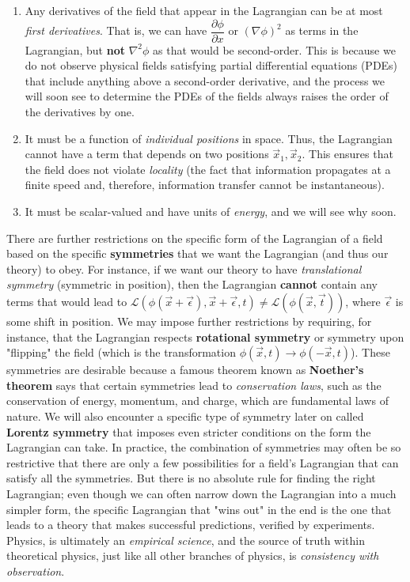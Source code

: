 \begin{enumerate}
    \item Any derivatives of the field that appear in the Lagrangian can be at most \emph{first derivatives}. That is, we can have $\dfrac{\partial \phi}{\partial x}$ or $(\nabla \phi)^2$ as terms in the Lagrangian, but \textbf{not} $\nabla^2 \phi$ as that would be second-order. This is because we do not observe physical fields satisfying partial differential equations (PDEs)   that include anything above a second-order derivative, and the process we will soon see to determine the PDEs of the fields always raises the order of the derivatives by one.
    \item It must be a function of \emph{individual positions} in space. Thus, the Lagrangian cannot have a term that depends on two positions $\vec x_1, \vec x_2$. This ensures that the field does not violate \emph{locality} (the fact that information propagates at a finite speed and, therefore, information transfer cannot be instantaneous).
    \item It must be scalar-valued and have units of \emph{energy}, and we will see why soon.
\end{enumerate}

There are further restrictions on the specific form of the Lagrangian of a field based on the specific \textbf{symmetries} that we want the Lagrangian (and thus our theory) to obey. For instance, if we want our theory to have \emph{translational symmetry} (symmetric in position), then the Lagrangian \textbf{cannot} contain any terms that would lead to $\mathscr{L}(\phi(\vec x + \vec \epsilon), \vec x + \vec \epsilon, t) \neq \mathscr{L}(\phi(\vec x, \vec t))$, where $\vec \epsilon$ is some shift in position. We may impose further restrictions by requiring, for instance, that the Lagrangian respects \textbf{rotational symmetry} or symmetry upon "flipping" the field (which is the transformation $\phi(\vec x, t) \to \phi(-\vec x, t)$). These symmetries are desirable because a famous theorem known as \textbf{Noether's theorem} says that certain symmetries lead to \emph{conservation laws}, such as the conservation of energy, momentum, and charge, which are fundamental laws of nature. We will also encounter a specific type of symmetry later on called \textbf{Lorentz symmetry} that imposes even stricter conditions on the form the Lagrangian can take. In practice, the combination of symmetries may often be so restrictive that there are only a few possibilities for a field's Lagrangian that can satisfy all the symmetries. But there is no absolute rule for finding the right Lagrangian; even though we can often narrow down the Lagrangian into a much simpler form, the specific Lagrangian that "wins out" in the end is the one that leads to a theory that makes successful predictions, verified by experiments. Physics, is ultimately an \emph{empirical science}, and the source of truth within theoretical physics, just like all other branches of physics, is \emph{consistency with observation}.

